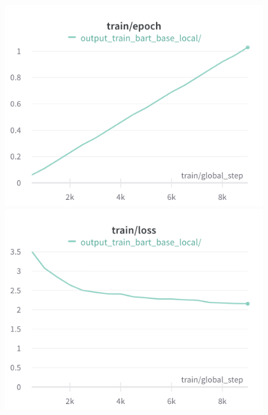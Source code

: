 \documentclass{article}
\begin{document}
\begin{figure}[!htb]
\includegraphics[width=\linewidth]{charts/Section-8-Panel-0-b9jdvbp9c}
\caption{}
\endminipage\hfill
{}
\includegraphics[width=\linewidth]{charts/Section-8-Panel-1-uc1nwfci0}
\caption{}
\endminipage
\end{figure}
\end{document}
